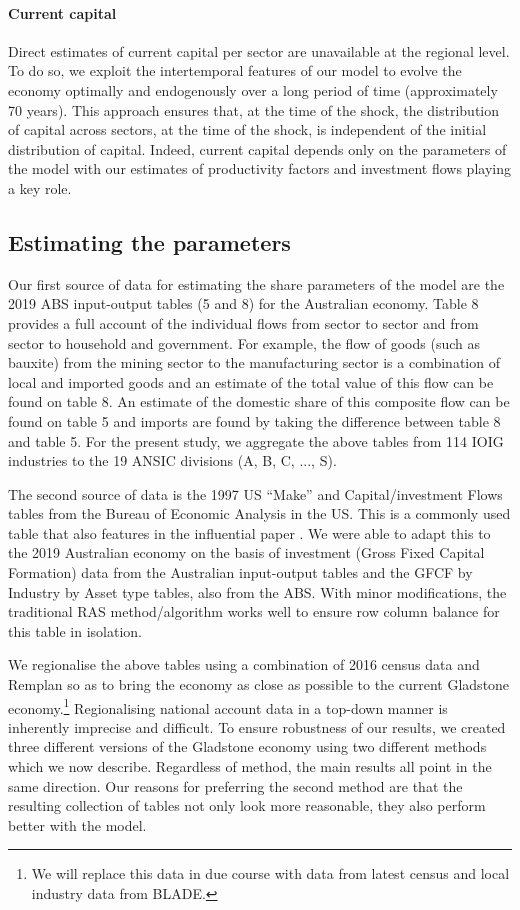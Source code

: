 \documentclass[12pt,a4paper]{article}
\begin{document}
\paragraph{Current capital} Direct estimates of current capital per sector are
unavailable at the regional level. To do so, we exploit the intertemporal
features of our model to evolve the economy optimally and endogenously over a
long period of time (approximately 70 years).  This approach ensures that, at
the time of the shock, the distribution of capital across sectors, at the time
of the shock, is independent of the initial distribution of capital.  Indeed,
current capital depends only on the parameters of the model with our estimates
of productivity factors and investment flows playing a key role. 

\subsection*{Estimating the parameters} Our first source of data for estimating
the share parameters of the model are the 2019 ABS input-output
tables (5 and 8) for the Australian economy. Table 8 provides a full account of
the individual flows from sector to sector and from sector to household and
government.  For example, the flow of goods (such as bauxite) from the mining
sector to the manufacturing sector is a combination of local and imported goods
and an estimate of the total value of this flow can be found on table 8.  An
estimate of the domestic share of this composite flow can be found on table 5
and imports are found by taking the difference between table 8 and table 5.
For the present study, we aggregate the above tables from 114 IOIG industries
to the 19 ANSIC divisions (A, B, C, ..., S). 

The second source of data is the 1997 US “Make” and Capital/investment Flows
tables from the Bureau of Economic Analysis in the US. This is a commonly used
table that also features in the influential paper \cite{Atalay}.
We were able to adapt this to the 2019 Australian economy on the basis of
investment (Gross Fixed Capital Formation) data from the Australian
input-output tables and the GFCF by Industry by Asset type tables, also from
the ABS. With minor modifications, the traditional RAS method/algorithm works
well to ensure row column balance for this table in isolation.

We regionalise the above tables using a combination of 2016 census data and
Remplan so as to bring the economy as close as possible to the current
Gladstone economy.\footnote{We will replace this data in due course with data
from latest census and local industry data from BLADE.} Regionalising national
account data in a top-down manner is inherently imprecise and difficult. To
ensure robustness of our results, we created three different versions of the
Gladstone economy using two different methods which we now describe.
Regardless of method, the main results all point in the same direction. Our
reasons for preferring the second method are that the resulting collection of
tables not only look more reasonable, they also perform better with the
model.
\end{document}
